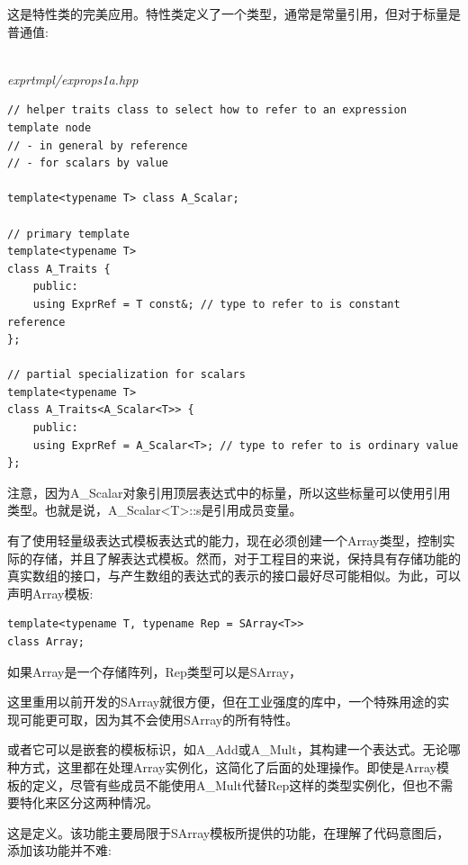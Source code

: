 这是特性类的完美应用。特性类定义了一个类型，通常是常量引用，但对于标量是普通值:

\hspace*{\fill} \\ %
\noindent
\textit{exprtmpl/exprops1a.hpp}
\begin{lstlisting}[style=styleCXX]
// helper traits class to select how to refer to an expression template node
// - in general by reference
// - for scalars by value

template<typename T> class A_Scalar;

// primary template
template<typename T>
class A_Traits {
	public:
	using ExprRef = T const&; // type to refer to is constant reference
};

// partial specialization for scalars
template<typename T>
class A_Traits<A_Scalar<T>> {
	public:
	using ExprRef = A_Scalar<T>; // type to refer to is ordinary value
};
\end{lstlisting}

注意，因为A\_Scalar对象引用顶层表达式中的标量，所以这些标量可以使用引用类型。也就是说，A\_Scalar<T>::s是引用成员变量。


有了使用轻量级表达式模板表达式的能力，现在必须创建一个Array类型，控制实际的存储，并且了解表达式模板。然而，对于工程目的来说，保持具有存储功能的真实数组的接口，与产生数组的表达式的表示的接口最好尽可能相似。为此，可以声明Array模板:

\begin{lstlisting}[style=styleCXX]
template<typename T, typename Rep = SArray<T>>
class Array;
\end{lstlisting}

如果Array是一个存储阵列，Rep类型可以是SArray，

\begin{tcolorbox}[colback=webgreen!5!white,colframe=webgreen!75!black]
\hspace*{0.75cm}这里重用以前开发的SArray就很方便，但在工业强度的库中，一个特殊用途的实现可能更可取，因为其不会使用SArray的所有特性。
\end{tcolorbox}

或者它可以是嵌套的模板标识，如A\_Add或A\_Mult，其构建一个表达式。无论哪种方式，这里都在处理Array实例化，这简化了后面的处理操作。即使是Array模板的定义，尽管有些成员不能使用A\_Mult代替Rep这样的类型实例化，但也不需要特化来区分这两种情况。

这是定义。该功能主要局限于SArray模板所提供的功能，在理解了代码意图后，添加该功能并不难:

